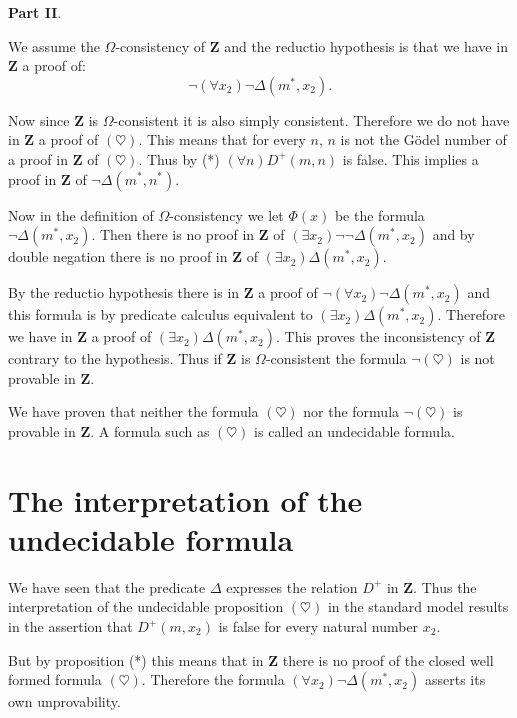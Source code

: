 \documentclass[12pt]{article}
\begin{document}
\medskip
\begin{large}
\textbf{Part II}.
\end{large}

We assume the $\Omega$-consistency of $\textbf{Z}$ and the reductio hypothesis is that we have in $\textbf{Z}$ a proof of:
$$\neg (\forall x_2) \neg \Delta (m^*, x_2).$$

Now since $\textbf{Z}$ is $\Omega$-consistent it is also simply consistent. Therefore we do not have in $\textbf{Z}$ a proof of $(\heartsuit)$. This means that for every $n$, $n$ is not the G\"{o}del number of a proof in $\textbf{Z}$ of $(\heartsuit)$. Thus by (*) \hspace{2em} $(\forall n) D^{+} (m, n)$ is false. This implies a proof in $\textbf{Z}$ of $\neg \Delta (m^*, n^*)$.

Now in the definition of $\Omega$-consistency we let $\Phi (x)$ be the formula $\neg \Delta (m^*, x_2)$. Then there is no proof in $\textbf{Z}$ of $(\exists x_2) \neg \neg \Delta (m^*, x_2)$ and by double negation there is no proof in $\textbf{Z}$ of $(\exists x_2) \Delta (m^*, x_2).$

By the reductio hypothesis there is in $\textbf{Z}$ a proof of $\neg (\forall x_2) \neg \Delta (m^*, x_2)$ and this formula is by predicate calculus equivalent to $(\exists x_2) \Delta (m^*, x_2)$. Therefore we have in $\textbf{Z}$ a proof of $(\exists x_2) \Delta (m^*, x_2)$. This proves the inconsistency of $\textbf{Z}$ contrary to the hypothesis. Thus if $\textbf{Z}$ is $\Omega$-consistent the formula $\neg (\heartsuit)$ is not provable in $\textbf{Z}$.

We have proven that neither the formula $(\heartsuit)$ nor the formula $\neg (\heartsuit)$ is provable in $\textbf{Z}$. A formula such as $(\heartsuit)$ is called an undecidable formula.

\section{The interpretation of the undecidable formula}\normalsize

We have seen that the predicate $\Delta$ expresses the relation $D^{+}$ in $\textbf{Z}$. Thus the interpretation of the  undecidable proposition $(\heartsuit)$ in the standard model results in the assertion that $D^{+} (m, x_2)$ is false for every natural number $x_2$.

But by proposition (*) this means that in $\textbf{Z}$ there is no proof of the closed well formed formula $(\heartsuit)$. Therefore the formula $(\forall x_2) \neg \Delta (m^*, x_2)$ asserts its own unprovability.
\end{document}
